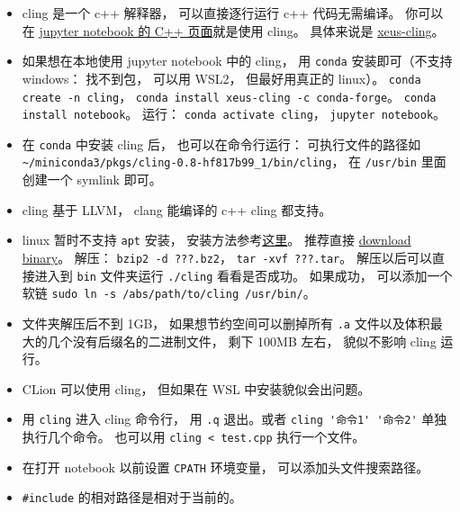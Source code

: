 
\begin{issues}
\issueDraft
\end{issues}

\begin{itemize}
\item cling 是一个 c++ 解释器， 可以直接逐行运行 c++ 代码无需编译。 你可以在 \href{https://jupyter.org/try}{jupyter notebook 的 C++ 页面}就是使用 cling。 具体来说是 \href{https://xeus-cling.readthedocs.io/en/latest/index.html}{xeus-cling}。
\item 如果想在本地使用 jupyter notebook 中的 cling， 用 \verb|conda| 安装即可（不支持 windows： 找不到包， 可以用 WSL2， 但最好用真正的 linux）。 \verb|conda create -n cling|， \verb|conda install xeus-cling -c conda-forge|。 \verb|conda install notebook|。 运行： \verb|conda activate cling|， \verb|jupyter notebook|。
\item 在 \verb|conda| 中安装 cling 后， 也可以在命令行运行： 可执行文件的路径如 \verb|~/miniconda3/pkgs/cling-0.8-hf817b99_1/bin/cling|， 在 \verb|/usr/bin| 里面创建一个 symlink 即可。
\item cling 基于 LLVM， clang 能编译的 c++ cling 都支持。
\item linux 暂时不支持 \verb|apt| 安装， 安装方法参考\href{https://kaustubh13.medium.com/how-to-install-cling-on-linux-or-wsl-8125798ed9b9}{这里}。 推荐直接 \href{https://root.cern/download/cling/}{download binary}。 解压： \verb|bzip2 -d ???.bz2|， \verb|tar -xvf ???.tar|。 解压以后可以直接进入到 \verb|bin| 文件夹运行 \verb|./cling| 看看是否成功。 如果成功， 可以添加一个软链 \verb|sudo ln -s /abs/path/to/cling /usr/bin/|。
\item 文件夹解压后不到 1GB， 如果想节约空间可以删掉所有 \verb|.a| 文件以及体积最大的几个没有后缀名的二进制文件， 剩下 100MB 左右， 貌似不影响 cling 运行。
\item CLion 可以使用 cling， 但如果在 WSL 中安装貌似会出问题。
\item 用 \verb|cling| 进入 cling 命令行， 用 \verb|.q| 退出。或者 \verb|cling '命令1' '命令2'| 单独执行几个命令。 也可以用 \verb|cling < test.cpp| 执行一个文件。
\item 在打开 notebook 以前设置 \verb|CPATH| 环境变量， 可以添加头文件搜索路径。
\item \verb|#include| 的相对路径是相对于当前的。
\end{itemize}

